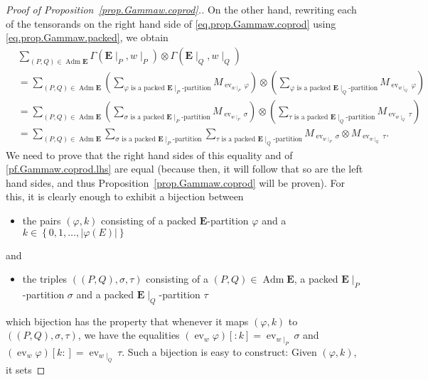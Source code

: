 \documentclass[12pt]{article}
\theoremstyle{plain}
\theoremstyle{definition}
\theoremstyle{remark}
\let\sumnonlimits\sum
\renewcommand{\sum}{\sumnonlimits\limits}
\newcommand{\ev}{\operatorname{ev}}
\newcommand{\Adm}{\operatorname{Adm}}
\newcommand{\EE}{{\mathbf{E}}}
\begin{document}
\begin{proof}[Proof of Proposition~\ref{prop.Gammaw.coprod}.]
On the other hand, rewriting each of the tensorands on the right
hand side of \eqref{eq.prop.Gammaw.coprod} using
\eqref{eq.prop.Gammaw.packed}, we obtain
\begin{align*}
& \sum_{\left(P, Q\right) \in \Adm \EE}
\Gamma\left(\EE\mid_P, w\mid_P\right)
\otimes \Gamma\left(\EE\mid_Q, w\mid_Q\right) \\
&= \sum_{\left(P, Q\right) \in \Adm \EE}
\left(\sum_{\varphi \text{ is a packed } \EE\mid_P\text{-partition}}
M_{\ev_{w\mid_P} \varphi}\right)
\otimes
\left(\sum_{\varphi \text{ is a packed } \EE\mid_Q\text{-partition}}
M_{\ev_{w\mid_Q} \varphi}\right) \\
& = \sum_{\left(P, Q\right) \in \Adm \EE}
\left(\sum_{\sigma \text{ is a packed } \EE\mid_P\text{-partition}}
M_{\ev_{w\mid_P} \sigma}\right)
\otimes
\left(\sum_{\tau \text{ is a packed } \EE\mid_Q\text{-partition}}
M_{\ev_{w\mid_Q} \tau}\right) \\
& = \sum_{\left(P, Q\right) \in \Adm \EE}
\sum_{\sigma \text{ is a packed } \EE\mid_P\text{-partition}}
\sum_{\tau \text{ is a packed } \EE\mid_Q\text{-partition}}
M_{\ev_{w\mid_P} \sigma}
\otimes
M_{\ev_{w\mid_Q} \tau} .
\end{align*}
We need to prove that the right hand sides of this equality and of
\eqref{pf.Gammaw.coprod.lhs} are equal (because then, it will follow
that so are the left hand sides, and thus
Proposition~\ref{prop.Gammaw.coprod} will be proven). For this, it
is clearly enough to exhibit a bijection between
\begin{itemize}
\item the pairs
$\left(\varphi, k\right)$ consisting of a packed $\EE$-partition
$\varphi$ and a
$k \in \left\{0, 1, \ldots, \left|\varphi\left(E\right)\right|
\right\}$
\end{itemize}
and
\begin{itemize}
\item the triples $\left(\left(P, Q\right), \sigma, \tau
\right)$ consisting of a $\left(P, Q\right) \in \Adm \EE$, a packed
$\EE\mid_P$-partition $\sigma$ and a packed $\EE\mid_Q$-partition
$\tau$
\end{itemize}
which bijection has the property that
whenever it maps $\left(\varphi, k\right)$ to
$\left(\left(P, Q\right), \sigma, \tau\right)$,
we have the equalities
$\left(\ev_w \varphi\right)\left[:k\right]
= \ev_{w\mid_P}\sigma$
and
$\left(\ev_w \varphi\right)\left[k:\right]
= \ev_{w\mid_Q}\tau$.
Such a bijection is easy to construct: Given
$\left(\varphi, k\right)$, it sets

\end{proof}
\end{document}
